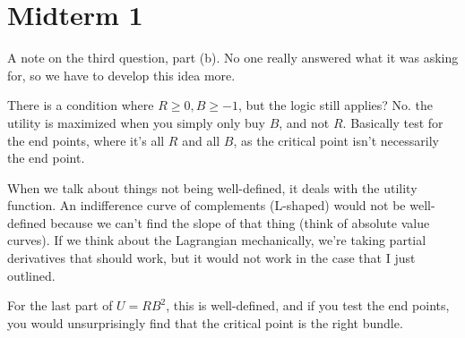 \section*{Midterm 1}

A note on the third question, part (b). No one really answered what it was asking for, so we have to develop this idea more.

There is a condition where $R \ge 0, B \ge -1$, but the logic still applies? No. the utility is maximized when you simply only buy $B$, and not $R$. Basically test for the end points, where it's all $R$ and all $B$, as the critical point isn't necessarily the end point.

When we talk about things not being well-defined, it deals with the utility function. An indifference curve of complements (L-shaped) would not be well-defined because we can't find the slope of that thing (think of absolute value curves). If we think about the Lagrangian mechanically, we're taking partial derivatives that should work, but it would not work in the case that I just outlined.

For the last part of $U = RB^2$, this is well-defined, and if you test the end points, you would unsurprisingly find that the critical point is the right bundle.
